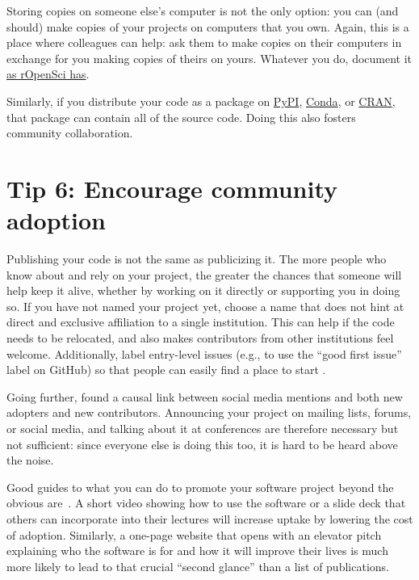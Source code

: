 \documentclass[10pt,letterpaper]{article}
\begin{document}
Storing copies on someone else's computer is not the only option:
you can (and should) make copies of your projects on computers that you own.
Again,
this is a place where colleagues can help:
ask them to make copies on their computers in exchange for you making copies of theirs on yours.
Whatever you do,
document it \href{https://ropensci.org/blog/2022/03/22/safeguards-and-backups-for-github-organizations/}{as rOpenSci has}.

Similarly,
if you distribute your code as a package on \href{https://pypi.org/}{PyPI},
\href{https://anaconda.org/anaconda/conda}{Conda},
or \href{https://cran.r-project.org/}{CRAN},
that package can contain all of the source code.
Doing this also fosters community collaboration.

\section*{Tip 6: Encourage community adoption}

Publishing your code is not the same as publicizing it.
The more people who know about and rely on your project,
the greater the chances that someone will help keep it alive,
whether by working on it directly or supporting you in doing so.
If you have not named your project yet,
choose a name that does not hint at direct and exclusive affiliation to a single institution.
This can help if the code needs to be relocated,
and also makes contributors from other institutions feel welcome.
Additionally,
label entry-level issues
(e.g., to use the ``good first issue'' label on GitHub)
so that people can easily find a place to start \cite{Steinmacher2015}.

Going further,
\cite{Fang2022} found a causal link between social media mentions and both new adopters and new contributors.
Announcing your project on mailing lists, forums, or social media,
and talking about it at conferences are therefore necessary but not sufficient:
since everyone else is doing this too,
it is hard to be heard above the noise.

Good guides to what you can do to promote your software project beyond the obvious are~\cite{Kuchner2011,BelliniSaibene2024}.
A short video showing how to use the software
or a slide deck that others can incorporate into their lectures
will increase uptake by lowering the cost of adoption.
Similarly,
a one-page website that opens with an elevator pitch
explaining who the software is for
and how it will improve their lives
is much more likely to lead to that crucial ``second glance''
than a list of publications.
\end{document}
